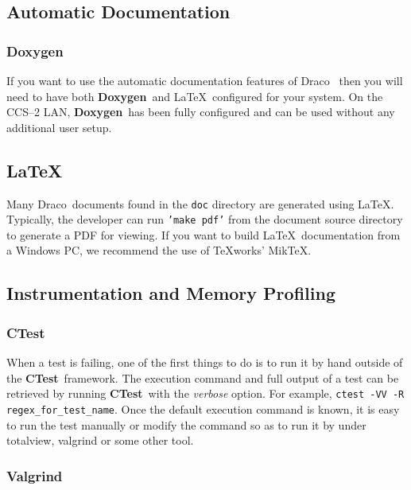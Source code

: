 \documentclass[11pt]{nmemo}
\newcommand{\comp}[1]{\normalfont\footnotesize\texttt{#1}\normalsize}
\newcommand{\draco}{{\normalfont\sffamily Draco}}
\newcommand{\doxygen}{{\normalfont\bfseries Doxygen}}
\newcommand{\ctest}{{\normalfont\bfseries CTest}}
\begin{document}
\subsection{Automatic Documentation}

\subsubsection{Doxygen}
\label{doxygen}

If you want to use the automatic documentation features of
\draco~\cite{doxygen} then you will need to have both \doxygen\ and
\LaTeX\ configured for your system.  On the CCS--2 LAN, \doxygen\ has
been fully configured and can be used without any additional user
setup. 

\subsection{LaTeX}
\label{latex}

Many \draco\ documents found in the \comp{doc} directory are
generated using \LaTeX.  Typically, the developer can run
\comp{'make pdf'} from the document source directory to generate a
PDF for viewing.  If you want to build \LaTeX\ documentation from a Windows PC, we recommend the use of TeXworks' MikTeX.

\subsection{Instrumentation and Memory Profiling}

\subsubsection{CTest}
When a test is failing, one of the first things to do is to run it by hand outside of the \ctest\ framework.  The execution command and full output of a test can be retrieved by running \ctest\ with the \textit{verbose} option. For example, \comp{ctest -VV -R regex\_for\_test\_name}.  Once the default execution command is known, it is easy to run the test manually or modify the command so as to run it by under totalview, valgrind or some other tool. 

\subsubsection{Valgrind}
\end{document}
